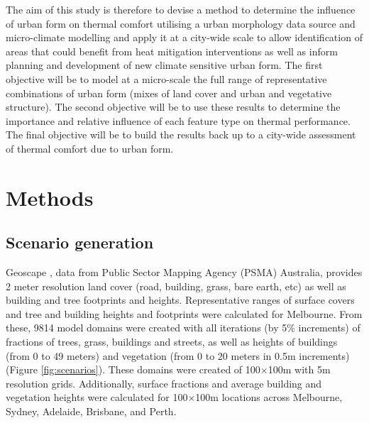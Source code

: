 \documentclass[final,3p,times,authoryear]{elsarticle}
\begin{document}
The aim of this study is therefore to devise a method to determine the influence of urban form on thermal comfort utilising a urban morphology data source and micro-climate modelling and apply it at a city-wide scale to allow identification of areas that could benefit from heat mitigation interventions as well as inform planning and development of new climate sensitive urban form. The first objective will be to model at a micro-scale the full range of representative combinations of urban form (mixes of land cover and urban and vegetative structure). The second objective will be to use these results to determine the importance and relative influence of each feature type on thermal performance. The final objective will be to build the results back up to a city-wide assessment of thermal comfort due to urban form.






\section{Methods}\label{sec:methods}



\subsection{Scenario generation}\label{sec:methodsgen}
Geoscape \citep{Geoscape2020}, data from Public Sector Mapping Agency (PSMA) Australia, provides 2 meter resolution land cover (road, building, grass, bare earth, etc) as well as building and tree footprints and heights. Representative ranges of surface covers and tree and building heights and footprints were calculated for Melbourne. From these, 9814 model domains were created with all iterations (by 5\% increments) of fractions of trees, grass, buildings and streets, as well as heights of buildings (from 0 to 49 meters) and vegetation (from 0 to 20 meters in 0.5m increments) (Figure \ref{fig:scenarios}). These domains were created of 100$\times$100m with 5m resolution grids. Additionally, surface fractions and average building and vegetation heights were calculated for 100$\times$100m locations across Melbourne, Sydney, Adelaide, Brisbane, and Perth.
\end{document}
